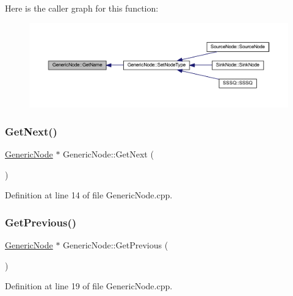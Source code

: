 Here is the caller graph for this function\+:
\nopagebreak
\begin{figure}[H]
\begin{center}
\leavevmode
\includegraphics[width=350pt]{class_generic_node_aaf9d163658172370e01ef5da113b66e0_icgraph}
\end{center}
\end{figure}
\mbox{\label{class_generic_node_aae0ee4c56b5478de7a6790cab2df7adb}} 
\subsubsection{\texorpdfstring{Get\+Next()}{GetNext()}}
{\footnotesize\ttfamily \hyperlink{class_generic_node}{Generic\+Node} $\ast$ Generic\+Node\+::\+Get\+Next (\begin{DoxyParamCaption}{ }\end{DoxyParamCaption})}



Definition at line 14 of file Generic\+Node.\+cpp.

\mbox{\label{class_generic_node_a58305c86cd4f8f46909ba022eb010587}} 
\subsubsection{\texorpdfstring{Get\+Previous()}{GetPrevious()}}
{\footnotesize\ttfamily \hyperlink{class_generic_node}{Generic\+Node} $\ast$ Generic\+Node\+::\+Get\+Previous (\begin{DoxyParamCaption}{ }\end{DoxyParamCaption})}



Definition at line 19 of file Generic\+Node.\+cpp.

